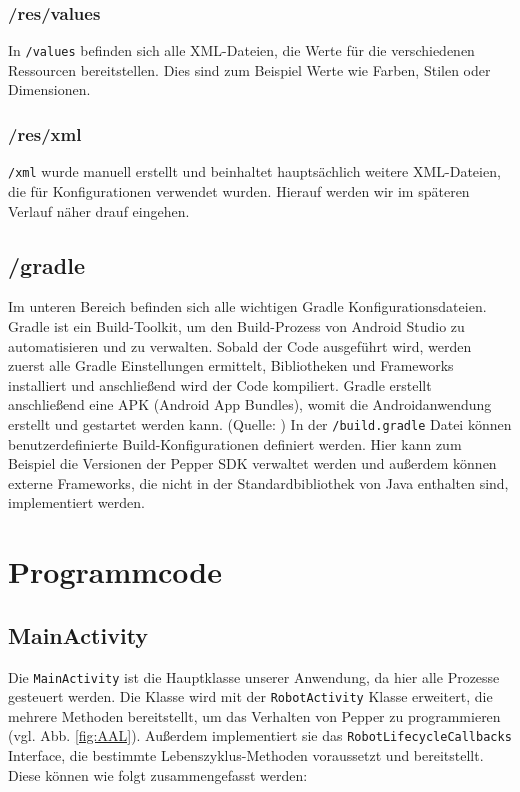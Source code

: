 \subsubsection*{/res/values}
In \verb|/values| befinden sich alle XML-Dateien, die Werte für die verschiedenen Ressourcen bereitstellen. Dies sind zum Beispiel Werte wie Farben, Stilen oder Dimensionen.

\subsubsection*{/res/xml}
\verb|/xml| wurde manuell erstellt und beinhaltet hauptsächlich weitere XML-Dateien, die für Konfigurationen verwendet wurden. Hierauf werden wir im späteren Verlauf näher drauf eingehen. 

\subsection*{/gradle}
Im unteren Bereich befinden sich alle wichtigen Gradle Konfigurationsdateien. Gradle ist ein Build-Toolkit, um den Build-Prozess von Android Studio zu automatisieren und zu verwalten. Sobald der Code ausgeführt wird, werden zuerst alle Gradle Einstellungen ermittelt, Bibliotheken und Frameworks installiert und anschließend wird der Code kompiliert. Gradle erstellt anschließend eine APK (Android App Bundles), womit die Androidanwendung erstellt und gestartet werden kann. (Quelle: \cite{Gradle})
In der \verb|/build.gradle| Datei können benutzerdefinierte Build-Konfigurationen definiert werden. Hier kann zum Beispiel die Versionen der Pepper SDK verwaltet werden und außerdem können externe Frameworks, die nicht in der Standardbibliothek von Java enthalten sind, implementiert werden.\\

\section{Programmcode}

\subsection{MainActivity}

Die \verb|MainActivity| ist die Hauptklasse unserer Anwendung, da hier alle Prozesse gesteuert werden. Die Klasse wird mit der \verb|RobotActivity| Klasse erweitert, die mehrere Methoden bereitstellt, um das Verhalten von Pepper zu programmieren (vgl. Abb. \ref{fig:AAL}). Außerdem implementiert sie das \verb|RobotLifecycleCallbacks| Interface, die bestimmte Lebenszyklus-Methoden voraussetzt 
und bereitstellt. Diese können wie folgt zusammengefasst werden:\\

